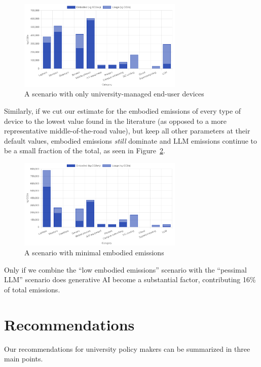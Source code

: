 \documentclass[11pt]{article}
\begin{document}
\begin{figure}[h]
  \centering
  \includegraphics[width=0.7\textwidth]{fig-sens1.png}
  \caption{A scenario with only university-managed end-user devices}
  \label{fig:sens1}
\end{figure}

Similarly, if we cut our estimate for the embodied emissions of every type of device to the lowest value found in the literature (as opposed to a more representative middle-of-the-road value), but keep all other parameters at their default values,  embodied emissions {\em still} dominate and LLM emissions continue to be a small fraction of the total, as seen in Figure~\ref{fig:sens2}.

\begin{figure}[h]
  \centering
  \includegraphics[width=0.7\textwidth]{fig-sens2.png}
  \caption{A scenario with minimal embodied emissions}
  \label{fig:sens2}
\end{figure}

Only if we combine the ``low embodied emissions'' scenario with the ``pessimal LLM'' scenario does generative AI become a substantial factor, contributing 16\% of total emissions.

\section{Recommendations}
\label{sec:recommendations}

Our recommendations for university policy makers can be summarized in three main points.
\end{document}
